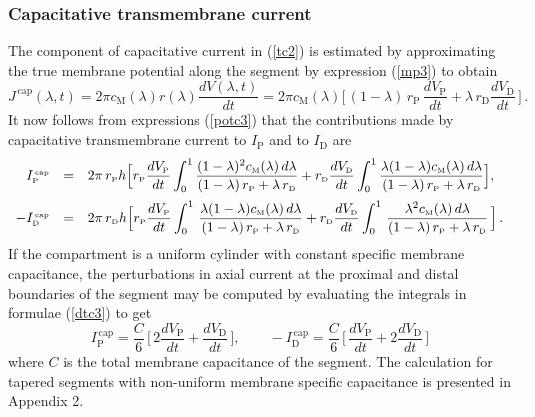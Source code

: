 \subsubsection{Capacitative transmembrane current}\label{CapCurrent}

The component of capacitative current in (\ref{tc2}) is estimated
by approximating the true membrane potential along the segment by
expression (\ref{mp3}) to obtain
\begin{equation}\label{dtc2}
J^\mathrm{\,cap}(\lambda,t)=2\pi
c_\mathrm{M}(\lambda) r(\lambda) \frac{dV(\lambda,t)}{dt} = 2\pi
c_\mathrm{M}(\lambda) \Big[\,(1-\lambda)\,r_\mathrm{P}\,\frac{dV_\mathrm{P}}{dt}
+\lambda\,r_\mathrm{D}\frac{dV_\mathrm{D}}{dt}\,\Big]\,.
\end{equation}
It now follows from expressions (\ref{potc3}) that the
contributions  made by capacitative transmembrane current to
$I_\mathrm{P}$ and to $I_\mathrm{D}$ are
\begin{equation}\label{dtc3}
\begin{array}{rcl}
I^{\mbox{\tiny \,cap}}_{\mbox{\tiny P}} & = & 2\pi\, r_{\mbox{\tiny P}} h
\displaystyle\Big[r_{\mbox{\tiny P}}\frac{dV_{\mbox{\tiny P}}}{dt}
\int_0^1\frac{(1-\lambda)^2 c_{\mbox{\tiny M}}(\lambda)\,d\lambda}
{(1-\lambda)\,r_{\mbox{\tiny P}}+\lambda\,r_{\mbox{\tiny D}}}
+r_{\mbox{\tiny D}}\frac{dV_{\mbox{\tiny D}}}{dt}
\int_0^1 \frac{\lambda(1-\lambda)c_{\mbox{\tiny M}}(\lambda)\,d\lambda}
{(1-\lambda)\,r_{\mbox{\tiny P}}+\lambda\,r_{\mbox{\tiny D}}}\Big],\\[12pt]
-I^{\mbox{\tiny \,cap}}_{\mbox{\tiny D}} & = & 2\pi\, r_{\mbox{\tiny D}} h
\displaystyle\Big[r_{\mbox{\tiny P}}\frac{dV_{\mbox{\tiny P}}}{dt}\int_0^1\,
\frac{\lambda(1-\lambda)c_{\mbox{\tiny M}}(\lambda)\,d\lambda}
{(1-\lambda)\,r_{\mbox{\tiny P}}+\lambda\,r_{\mbox{\tiny D}}}+r_{\mbox{\tiny D}}
\frac{dV_{\mbox{\tiny D}}}{dt}\int_0^1\,\frac{\lambda^2
c_{\mbox{\tiny M}}(\lambda)\,d\lambda}
{(1-\lambda)\,r_{\mbox{\tiny P}}+\lambda\,r_{\mbox{\tiny D}}}\,\Big]\,.
\end{array}
\end{equation}
If the compartment is a uniform cylinder with constant specific
membrane capacitance, the perturbations in axial current at the
proximal and distal boundaries of the segment may be computed by
evaluating the integrals in formulae (\ref{dtc3}) to get
\begin{equation}\label{dtc4}
I^\mathrm{\,cap}_\mathrm{P} = \frac{C}{6}\,
\Big[\,2\frac{dV_\mathrm{P}}{dt}+\frac{dV_\mathrm{D}}{dt}\,\Big],
\qquad -I^\mathrm{\,cap}_\mathrm{D} = \frac{C}{6}\,
\Big[\,\frac{dV_\mathrm{P}}{dt}+2\frac{dV_\mathrm{D}}{dt} \,\Big]
\end{equation}
where $C$ is the total membrane capacitance of the segment. The
calculation for tapered segments with non-uniform membrane
specific capacitance is presented in Appendix 2.

